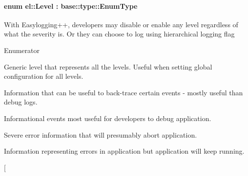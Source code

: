 \paragraph[{Level}]{\setlength{\rightskip}{0pt plus 5cm}enum {\bf el\+::\+Level} \+: base\+::type\+::\+Enum\+Type\hspace{0.3cm}{\ttfamily [strong]}}\label{a00183_ab0ac6091262344c52dd2d3ad099e8e36}
With Easylogging++, developers may disable or enable any level regardless of what the severity is. Or they can choose to log using hierarchical logging flag \begin{Desc}
\item[Enumerator]\par
\begin{description}
\item[{\em 
\hypertarget{a00183_ab0ac6091262344c52dd2d3ad099e8e36a4cc6684df7b4a92b1dec6fce3264fac8}{}Global\label{a00183_ab0ac6091262344c52dd2d3ad099e8e36a4cc6684df7b4a92b1dec6fce3264fac8}
}]Generic level that represents all the levels. Useful when setting global configuration for all levels. \item[{\em 
\hypertarget{a00183_ab0ac6091262344c52dd2d3ad099e8e36add4ec0ac4e58f7c32a01244ae91150b1}{}Trace\label{a00183_ab0ac6091262344c52dd2d3ad099e8e36add4ec0ac4e58f7c32a01244ae91150b1}
}]Information that can be useful to back-\/trace certain events -\/ mostly useful than debug logs. \item[{\em 
\hypertarget{a00183_ab0ac6091262344c52dd2d3ad099e8e36aa603905470e2a5b8c13e96b579ef0dba}{}Debug\label{a00183_ab0ac6091262344c52dd2d3ad099e8e36aa603905470e2a5b8c13e96b579ef0dba}
}]Informational events most useful for developers to debug application. \item[{\em 
\hypertarget{a00183_ab0ac6091262344c52dd2d3ad099e8e36a882384ec38ce8d9582b57e70861730e4}{}Fatal\label{a00183_ab0ac6091262344c52dd2d3ad099e8e36a882384ec38ce8d9582b57e70861730e4}
}]Severe error information that will presumably abort application. \item[{\em 
\hypertarget{a00183_ab0ac6091262344c52dd2d3ad099e8e36a902b0d55fddef6f8d651fe1035b7d4bd}{}Error\label{a00183_ab0ac6091262344c52dd2d3ad099e8e36a902b0d55fddef6f8d651fe1035b7d4bd}
}]Information representing errors in application but application will keep running. \item[{\em 
}
\end{description}
\end{Desc}

